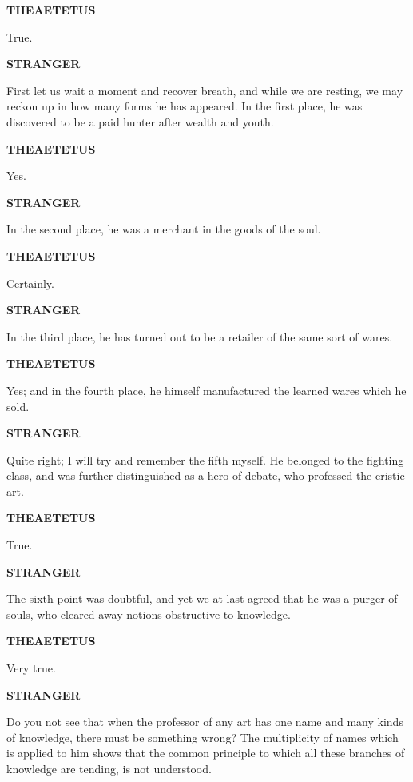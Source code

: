 \documentclass[11pt,letter]{article}
\begin{document}
\par \textbf{THEAETETUS}
\par   True.

\par \textbf{STRANGER}
\par   First let us wait a moment and recover breath, and while we are resting, we may reckon up in how many forms he has appeared. In the first place, he was discovered to be a paid hunter after wealth and youth.

\par \textbf{THEAETETUS}
\par   Yes.

\par \textbf{STRANGER}
\par   In the second place, he was a merchant in the goods of the soul.

\par \textbf{THEAETETUS}
\par   Certainly.

\par \textbf{STRANGER}
\par   In the third place, he has turned out to be a retailer of the same sort of wares.

\par \textbf{THEAETETUS}
\par   Yes; and in the fourth place, he himself manufactured the learned wares which he sold.

\par \textbf{STRANGER}
\par   Quite right; I will try and remember the fifth myself. He belonged to the fighting class, and was further distinguished as a hero of debate, who professed the eristic art.

\par \textbf{THEAETETUS}
\par   True.

\par \textbf{STRANGER}
\par   The sixth point was doubtful, and yet we at last agreed that he was a purger of souls, who cleared away notions obstructive to knowledge.

\par \textbf{THEAETETUS}
\par   Very true.

\par \textbf{STRANGER}
\par   Do you not see that when the professor of any art has one name and many kinds of knowledge, there must be something wrong? The multiplicity of names which is applied to him shows that the common principle to which all these branches of knowledge are tending, is not understood.
\end{document}
